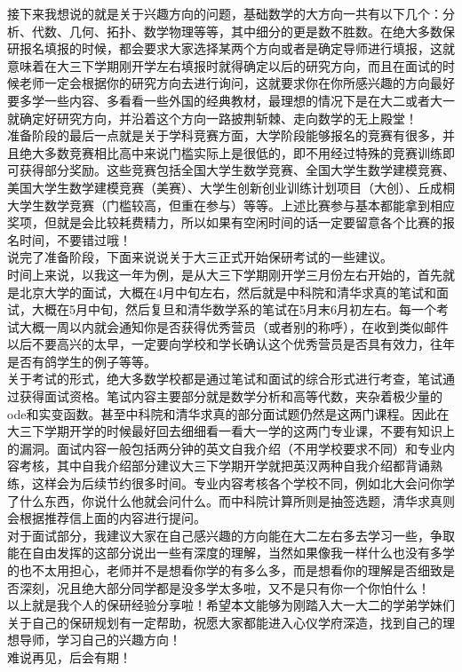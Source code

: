 \documentclass[a4paper,11pt,notitlepage]{article}
\begin{document}
\indent 接下来我想说的就是关于兴趣方向的问题，基础数学的大方向一共有以下几个：分析、代数、几何、拓扑、数学物理等等，其中细分的更是数不胜数。在绝大多数保研报名填报的时候，都会要求大家选择某两个方向或者是确定导师进行填报，这就意味着在大三下学期刚开学左右填报时就得确定以后的研究方向，而且在面试的时候老师一定会根据你的研究方向去进行询问，这就要求你在你所感兴趣的方向最好要多学一些内容、多看看一些外国的经典教材，最理想的情况下是在大二或者大一就确定好研究方向，并沿着这个方向一路披荆斩棘、走向数学的无上殿堂！\\
\indent 准备阶段的最后一点就是关于学科竞赛方面，大学阶段能够报名的竞赛有很多，并且绝大多数竞赛相比高中来说门槛实际上是很低的，即不用经过特殊的竞赛训练即可获得部分奖励。这些竞赛包括全国大学生数学竞赛、全国大学生数学建模竞赛、美国大学生数学建模竞赛（美赛）、大学生创新创业训练计划项目（大创）、丘成桐大学生数学竞赛（门槛较高，但重在参与）等等。上述比赛参与基本都能拿到相应奖项，但就是会比较耗费精力，所以如果有空闲时间的话一定要留意各个比赛的报名时间，不要错过哦！\\
\indent 说完了准备阶段，下面来说说关于大三正式开始保研考试的一些建议。\\
\indent 时间上来说，以我这一年为例，是从大三下学期刚开学三月份左右开始的，首先就是北京大学的面试，大概在4月中旬左右，然后就是中科院和清华求真的笔试和面试，大概在5月中旬，然后复旦和清华数学系的笔试在5月末6月初左右。每一个考试大概一周以内就会通知你是否获得优秀营员（或者别的称呼），在收到类似邮件以后不要高兴的太早，一定要向学校和学长确认这个优秀营员是否具有效力，往年是否有鸽学生的例子等等。\\
\indent 关于考试的形式，绝大多数学校都是通过笔试和面试的综合形式进行考查，笔试通过获得面试资格。笔试内容主要部分就是数学分析和高等代数，夹杂着极少量的ode和实变函数。甚至中科院和清华求真的部分面试题仍然是这两门课程。因此在大三下学期开学的时候最好回去细细看一看大一学的这两门专业课，不要有知识上的漏洞。面试内容一般包括两分钟的英文自我介绍（不用学校要求不同）和专业内容考核，其中自我介绍部分建议大三下学期开学就把英汉两种自我介绍都背诵熟练，这样会为后续节约很多时间。专业内容考核各个学校不同，例如北大会问你学了什么东西，你说什么他就会问什么。而中科院计算所则是抽签选题，清华求真则会根据推荐信上面的内容进行提问。\\
\indent 对于面试部分，我建议大家在自己感兴趣的方向能在大二左右多去学习一些，争取能在自由发挥的这部分说出一些有深度的理解，当然如果像我一样什么也没有多学的也不太用担心，老师并不是想看你学的有多么多，而是想看你的理解是否细致是否深刻，况且绝大部分同学都是没多学太多啦，又不是只有你一个你怕什么！\\
\indent 以上就是我个人的保研经验分享啦！希望本文能够为刚踏入大一大二的学弟学妹们关于自己的保研规划有一定帮助，祝愿大家都能进入心仪学府深造，找到自己的理想导师，学习自己的兴趣方向！\\
\indent 难说再见，后会有期！
\end{document}
